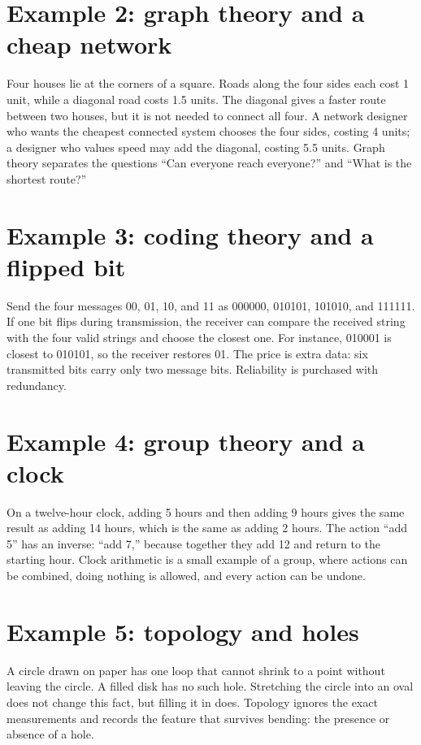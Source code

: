 \documentclass[11pt,oneside]{book}
\begin{document}
\section*{Example 2: graph theory and a cheap network}
Four houses lie at the corners of a square. Roads along the four sides each cost 1 unit, while a diagonal road costs 1.5 units. The diagonal gives a faster route between two houses, but it is not needed to connect all four. A network designer who wants the cheapest connected system chooses the four sides, costing 4 units; a designer who values speed may add the diagonal, costing 5.5 units. Graph theory separates the questions ``Can everyone reach everyone?'' and ``What is the shortest route?''

\section*{Example 3: coding theory and a flipped bit}
Send the four messages 00, 01, 10, and 11 as 000000, 010101, 101010, and 111111. If one bit flips during transmission, the receiver can compare the received string with the four valid strings and choose the closest one. For instance, 010001 is closest to 010101, so the receiver restores 01. The price is extra data: six transmitted bits carry only two message bits. Reliability is purchased with redundancy.

\section*{Example 4: group theory and a clock}
On a twelve-hour clock, adding 5 hours and then adding 9 hours gives the same result as adding 14 hours, which is the same as adding 2 hours. The action ``add 5'' has an inverse: ``add 7,'' because together they add 12 and return to the starting hour. Clock arithmetic is a small example of a group, where actions can be combined, doing nothing is allowed, and every action can be undone.

\section*{Example 5: topology and holes}
A circle drawn on paper has one loop that cannot shrink to a point without leaving the circle. A filled disk has no such hole. Stretching the circle into an oval does not change this fact, but filling it in does. Topology ignores the exact measurements and records the feature that survives bending: the presence or absence of a hole.
\end{document}
